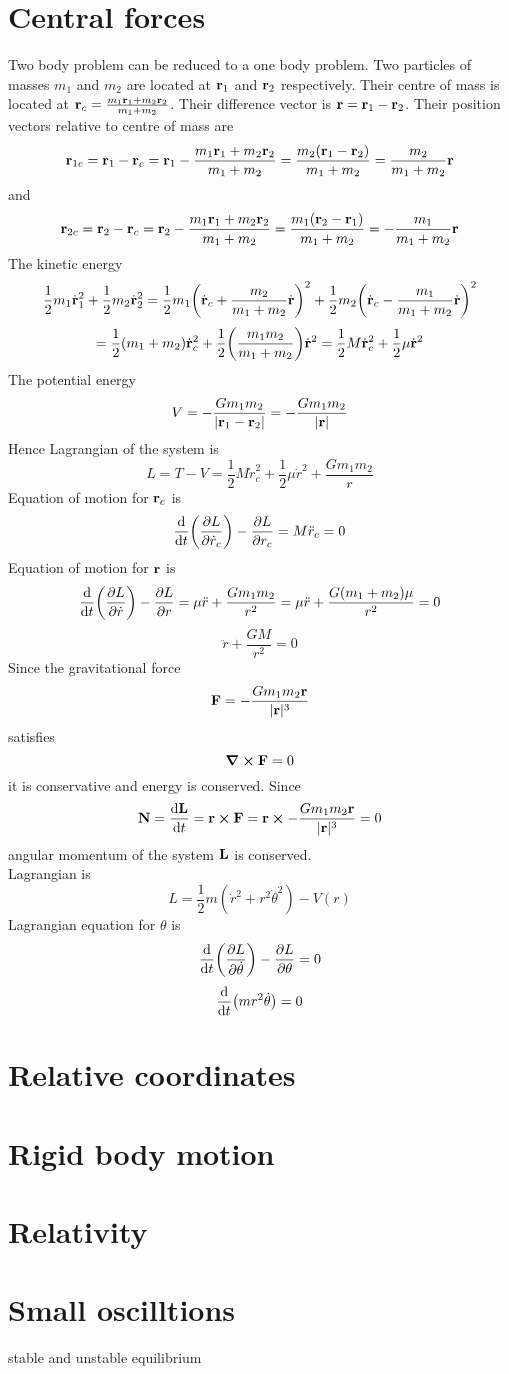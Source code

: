 \documentclass[12pt]{article}
\begin{document}
\section*{Central forces}
Two body problem can be reduced to a one body problem. Two particles of masses $m_1$ and $m_2$ are located at $\vb{r}_1$ and $\vb{r}_2$ respectively. Their centre of mass is located at $\vb{r}_c=\frac{m_1\vb{r}_1+m_2\vb{r}_2}{m_1+m_2}$. Their difference vector is $\vb{r}=\vb{r}_1-\vb{r}_2$. Their position vectors relative to centre of mass are \[\vb{r}_{1c}=\vb{r}_{1}-\vb{r}_{c}=\vb{r}_{1}-\frac{m_1\vb{r}_1+m_2\vb{r}_2}{m_1+m_2}=\frac{m_2(\vb{r}_1-\vb{r}_2)}{m_1+m_2}=\frac{m_2}{m_1+m_2}\vb{r}\] and 
\[\vb{r}_{2c}=\vb{r}_{2}-\vb{r}_{c}=\vb{r}_{2}-\frac{m_1\vb{r}_1+m_2\vb{r}_2}{m_1+m_2}=\frac{m_1(\vb{r}_2-\vb{r}_1)}{m_1+m_2}=-\frac{m_1}{m_1+m_2}\vb{r}\]
The kinetic energy \[\frac{1}{2}m_1\dot{\vb{r}}_1^2+\frac{1}{2}m_2\dot{\vb{r}}_2^2=\frac{1}{2}m_1\qty(\dot{\vb{r}}_{c}+\frac{m_2}{m_1+m_2}\dot{\vb{r}})^2+\frac{1}{2}m_2\qty(\dot{\vb{r}}_{c}-\frac{m_1}{m_1+m_2}\dot{\vb{r}})^2\]
\[=\frac{1}{2}(m_1+m_2)\dot{\vb{r}}_{c}^2+\frac{1}{2}\qty(\frac{m_1m_2}{m_1+m_2})\dot{\vb{r}}^2=\frac{1}{2}M\dot{\vb{r}}_{c}^2+\frac{1}{2}\mu\dot{\vb{r}}^2\]
The potential energy \[V=-\frac{Gm_1m_2}{|\vb{r}_1-\vb{r}_2|}=-\frac{Gm_1m_2}{|\vb{r}|}\]
Hence Lagrangian of the system is \[L=T-V=\frac{1}{2}M\dot{r}_c^2+\frac{1}{2}\mu \dot{r}^2+\frac{Gm_1m_2}{r}\]
Equation of motion for $\vb{r}_c$ is \[\dv{t}\qty(\pdv{L}{\dot{r}_c})-\pdv{L}{r_c}=M\ddot{r}_c=0\]
Equation of motion for $\vb{r}$ is \[\dv{t}\qty(\pdv{L}{\dot{r}})-\pdv{L}{r}=\mu\ddot{r}+\frac{Gm_1m_2}{r^2}=\mu\ddot{r}+\frac{G(m_1+m_2)\mu}{r^2}=0\]
\[\ddot{r}+\frac{GM}{r^2}=0\]
Since the gravitational force \[\vb{F}=-\frac{Gm_1m_2\vb{r}}{|\vb{r}|^3}\]
satisfies \[\curl{\vb{F}}=0\]
it is conservative and energy is conserved.
Since \[\vb{N}=\dv{\vb{L}}{t}=\vb{r}\cp\vb{F}=\vb{r}\cp-\frac{Gm_1m_2\vb{r}}{|\vb{r}|^3}=0\]
angular momentum of the system $\vb{L}$ is conserved.\\
Lagrangian is \[L=\frac{1}{2}m(\dot{r}^2+r^2\dot{\theta}^2)-V(r)\]
Lagrangian equation for $\theta$ is \[\dv{t}\qty(\pdv{L}{\dot{\theta}})-\pdv{L}{\theta}=0\]
\[\dv{t}\qty(mr^2\dot{\theta})=0\]
\section*{Relative coordinates}
\section*{Rigid body motion}
\section*{Relativity}
\section*{Small oscilltions}
stable and unstable equilibrium
\end{document}
